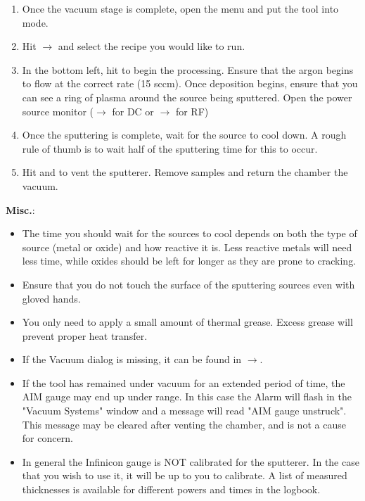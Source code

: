 \begin{enumerate}
\begin{enumerate} 
\end{enumerate}
\item Once the vacuum stage is complete, open the  menu and put the tool into  mode.
\item Hit $\rightarrow$ and select the recipe you would like to run.
\item In the bottom left, hit  to begin the processing. Ensure that the argon begins to flow at the correct rate (15 sccm).
      Once deposition begins, ensure that you can see a ring of plasma around the source being sputtered. Open the power source monitor ($\rightarrow$ for DC or
      $\rightarrow$ for RF)
\item Once the sputtering is complete, wait for the source to cool down. A rough rule of thumb is to wait half of the sputtering time for this
      to occur.
\item Hit  and  to vent the sputterer. Remove samples and return the chamber the vacuum.
\end{enumerate}

\noindent \textbf{Misc.}:
\begin{itemize}
\item The time you should wait for the sources to cool depends on both the type of source (metal or oxide) and how reactive it is.
      Less reactive metals will need less time, while oxides should be left for longer as they are prone to cracking.
\item Ensure that you do not touch the surface of the sputtering sources even with gloved hands.
\item You only need to apply a small amount of thermal grease. Excess grease will prevent proper heat transfer.
\item If the Vacuum dialog is missing, it can be found in $\rightarrow$.
\item If the tool has remained under vacuum for an extended period of time, the AIM gauge may end up under range. In this case
the Alarm will flash in the "Vacuum Systems" window and a message will read "AIM gauge unstruck". This message may be cleared after venting
the chamber, and is not a cause for concern.
\item In general the Infinicon gauge is NOT calibrated for the sputterer. In the case that you wish to use it, it will be up to you to calibrate.
A list of measured thicknesses is available for different powers and times in the logbook.
\end{itemize}
\newpage

